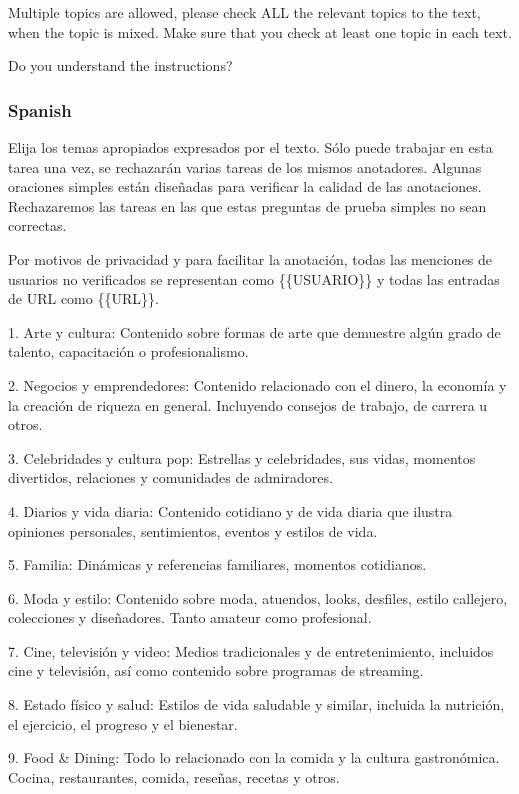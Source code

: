 Multiple topics are allowed, please check ALL the relevant topics to the text, when the topic is mixed.
Make sure that you check at least one topic in each text.
 
Do you understand the instructions?

\subsubsection{Spanish}
Elija los temas apropiados expresados por el texto.
Sólo puede trabajar en esta tarea una vez, se rechazarán varias tareas de los mismos anotadores.
Algunas oraciones simples están diseñadas para verificar la calidad de las anotaciones. Rechazaremos las tareas en las que estas preguntas de prueba simples no sean correctas.

Por motivos de privacidad y para facilitar la anotación, todas las menciones de usuarios no verificados se representan como \{\{USUARIO\}\} y todas las entradas de URL como \{\{URL\}\}.

1. Arte y cultura: Contenido sobre formas de arte que demuestre algún grado de talento, capacitación o profesionalismo.

2. Negocios y emprendedores: Contenido relacionado con el dinero, la economía y la creación de riqueza en general. Incluyendo consejos de trabajo, de carrera u otros.

3. Celebridades y cultura pop: Estrellas y celebridades, sus vidas, momentos divertidos, relaciones y comunidades de admiradores.

4. Diarios y vida diaria: Contenido cotidiano y de vida diaria que ilustra opiniones personales, sentimientos, eventos y estilos de vida.

5. Familia: Dinámicas y referencias familiares, momentos cotidianos.

6. Moda y estilo: Contenido sobre moda, atuendos, looks, desfiles, estilo callejero, colecciones y diseñadores. Tanto amateur como profesional.

7. Cine, televisión y video: Medios tradicionales y de entretenimiento, incluidos cine y televisión, así como contenido sobre programas de streaming.

8. Estado físico y salud: Estilos de vida saludable y similar, incluida la nutrición, el ejercicio, el progreso y el bienestar.

9. Food \& Dining: Todo lo relacionado con la comida y la cultura gastronómica. Cocina, restaurantes, comida, reseñas, recetas y otros.

